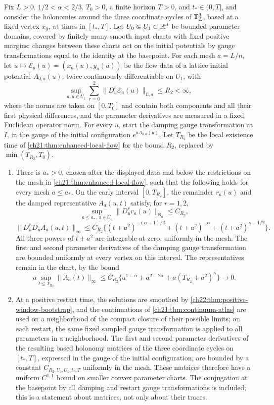 \begin{theorem}\label{ch22:thm:real-flow-variations}
Fix $L>0$, $1/2<\alpha<2/3$, $T_0>0$, a finite horizon $T>0$, and $t_*\in(0,T]$, and consider the holonomies around the three coordinate cycles of $\mathbb T_L^3$, based at a fixed vertex $x_0$, at times in $[t_*,T]$. Let $U_0\Subset U_1\subset\mathbb R^d$ be bounded parameter domains, covered by finitely many smooth input charts with fixed positive margins; changes between these charts act on the initial potentials by gauge transformations equal to the identity at the basepoint. For each mesh $a=L/n$, let $u\mapsto\mathcal E_a(u)=(x_a(u),y_a(u))$ be the flow data of a lattice initial potential $A_{0,a}(u)$, twice continuously differentiable on $U_1$, with
\[
 \sup_{a,u\in U_1}\sum_{r=0}^2\|D_u^r\mathcal E_a(u)\|_{\mathrm{fl},a}\le R_2<\infty,
\]
where the norms are taken on $[0,T_0]$ and contain both components and all their first physical differences, and the parameter derivatives are measured in a fixed Euclidean operator norm. For every $u$, start the damping gauge transformation at $I$, in the gauge of the initial configuration $e^{aA_{0,a}(u)}$. Let $T_{R_2}$ be the local existence time of \cref{ch21:thm:enhanced-local-flow} for the bound $R_2$, replaced by $\min(T_{R_2},T_0)$.
\begin{enumerate}
\item There is $a_*>0$, chosen after the displayed data and below the restrictions on the mesh in \cref{ch21:thm:enhanced-local-flow}, such that the following holds for every mesh $a\le a_*$. On the early interval $[0,T_{R_2}]$, the remainder $r_a(u)$ and the damped representative $A_a(u,t)$ satisfy, for $r=1,2$,
\[
 \sup_{a\le a_*,\,u\in U_0}\|D_u^rr_a(u)\|_{\mathsf R_a}\le C_{R_2},
\]
\[
 \|D_u^rD_aA_a(u,t)\|_\infty\le C_{R_2}\bigl\{(t+a^2)^{-(\alpha+1)/2}+(t+a^2)^{-\alpha}+(t+a^2)^{\kappa-1/2}\bigr\}.
\]
All three powers of $t+a^2$ are integrable at zero, uniformly in the mesh. The first and second parameter derivatives of the damping gauge transformation are bounded uniformly at every vertex on this interval. The representatives remain in the chart, by the bound
\[
 a\sup_{t\le T_{R_2}}\|A_a(t)\|_\infty\le C_{R_2}\bigl\{a^{1-\alpha}+a^{2-2\alpha}+a(T_{R_2}+a^2)^\kappa\bigr\}\longrightarrow0 .
\]
\item At a positive restart time, the solutions are smoothed by \cref{ch22:thm:positive-window-bootstrap}, and the continuations of \cref{ch21:thm:continuum-atlas} are used on a neighborhood of the compact closure of their possible limits; on each restart, the same fixed sampled gauge transformation is applied to all parameters in a neighborhood. The first and second parameter derivatives of the resulting based holonomy matrices of the three coordinate cycles on $[t_*,T]$, expressed in the gauge of the initial configuration, are bounded by a constant $C_{R_2,U_0,U_1,t_*,T}$ uniformly in the mesh. These matrices therefore have a uniform $C^{1,1}$ bound on smaller convex parameter charts. The conjugation at the basepoint by all damping and restart gauge transformations is included; this is a statement about matrices, not only about their traces.

\end{enumerate}
\end{theorem}

